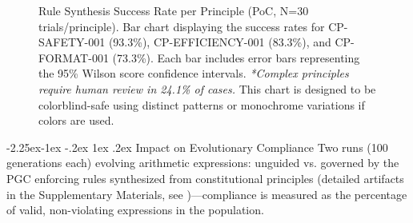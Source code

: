 \documentclass[manuscript,screen,review,anonymous,9pt]{acmart}
\makeatletter
\renewcommand\subsection{\@startsection{subsection}{2}{\z@}%
  {-2.25ex\@plus -1ex \@minus -.2ex}%
  {1ex \@plus .2ex}%
  {\normalfont\large\bfseries}}
\makeatother
\begin{document}
\begin{figure}[htbp]
	\centering
	\caption[Rule synthesis success rate bar chart]{Rule Synthesis Success Rate per Principle (PoC, N=30 trials/principle). Bar chart displaying the success rates for CP-SAFETY-001 (93.3\%), CP-EFFICIENCY-001 (83.3\%), and CP-FORMAT-001 (73.3\%). Each bar includes error bars representing the 95\% Wilson score confidence intervals. \textit{*Complex principles require human review in 24.1\% of cases.} This chart is designed to be colorblind-safe using distinct patterns or monochrome variations if colors are used.}
	\label{fig:rule_synthesis_chart}
\end{figure}

\subsection{Impact on Evolutionary Compliance}
\label{subsec:impact_compliance}
Two runs (100 generations each) evolving arithmetic expressions: unguided vs. governed by the PGC enforcing rules synthesized from constitutional principles (detailed artifacts in the Supplementary Materials, see )—compliance is measured as the percentage of valid, non-violating expressions in the population.
\end{document}
